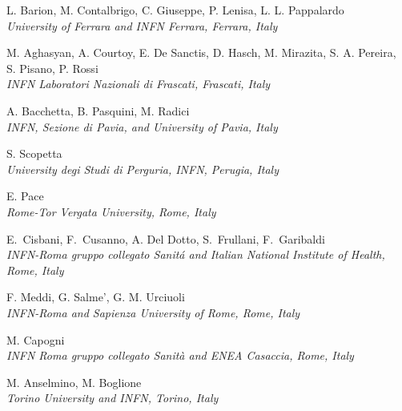 \documentclass[12pt]{article}
\begin{document}
\begin{center}
\large{L. Barion, M. Contalbrigo, C. Giuseppe, P. Lenisa, L. L. Pappalardo
}\\ 
\it{University of Ferrara and INFN Ferrara, Ferrara, Italy}
\end{center}

\begin{center}
\large{M. Aghasyan, A. Courtoy,
 E. De Sanctis, D. Hasch, M. Mirazita,
 S. A. Pereira, \\ S. Pisano, P. Rossi}\\ 
\it{INFN Laboratori Nazionali di Frascati, Frascati, Italy}
\end{center}

\begin{center}
\large{A. Bacchetta, B. Pasquini, M. Radici}\\
\it{INFN, Sezione di Pavia, and University of Pavia, Italy}
\end{center}

\begin{center}
\large{S. Scopetta}\\
\it{University degi Studi di Perguria, INFN, Perugia, Italy}
\end{center}

\begin{center}
\large{E. Pace}\\
\it{Rome-Tor Vergata University, Rome, Italy}
\end{center}

\begin{center}
\large{E.~Cisbani, F.~Cusanno, A. Del Dotto, S.~Frullani, F.~Garibaldi} \\
\it{INFN-Roma gruppo collegato Sanit\'a and Italian National Institute of
Health, Rome, Italy}
\end{center}

\begin{center}
\large{F. Meddi, G. Salme', G. M. Urciuoli} \\
\it{INFN-Roma and Sapienza University of Rome, Rome, Italy}
\end{center}

\begin{center}
\large{M. Capogni} \\
\it{INFN Roma gruppo collegato Sanit\`a and ENEA Casaccia, Rome, Italy}
\end{center}

\begin{center}
\large{M. Anselmino, M. Boglione}\\
\it{Torino University and INFN, Torino, Italy}
\end{center}
\end{document}
